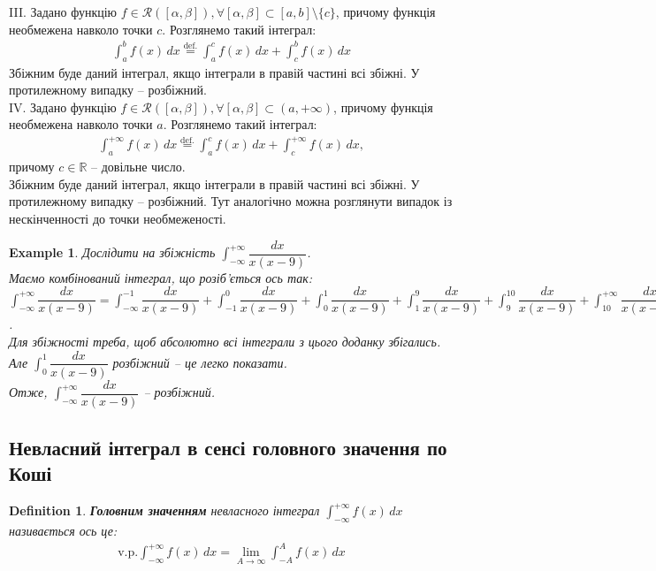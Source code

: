 \documentclass[a4paper, 10pt]{article}
\theoremstyle{theoremdd}
\theoremstyle{theoremdd}
\theoremstyle{theoremdd}
\newtheorem{definition}[theorem]{Definition}
\theoremstyle{theoremdd}
\theoremstyle{theoremdd}
\newtheorem{example}[theorem]{Example}
\theoremstyle{theoremdd}
\theoremstyle{theoremdd}
\theoremstyle{theoremdd}
\theoremstyle{theoremdd}
\begin{document}
III. Задано функцію $f \in \mathcal{R}([\alpha,\beta]), \forall [\alpha,\beta] \subset [a,b] \setminus \{c\}$, причому функція необмежена навколо точки $c$. Розглянемо такий інтеграл:
\begin{align*}
\int_a^b f(x)\,dx \overset{\text{def.}}{=} \int_a^c f(x)\,dx + \int_c^b f(x)\,dx
\end{align*}
Збіжним буде даний інтеграл, якщо інтеграли в правій частині всі збіжні. У протилежному випадку -- розбіжний.
\bigskip \\
IV. Задано функцію $f \in \mathcal{R}([\alpha,\beta]), \forall [\alpha,\beta] \subset (a,+\infty)$, причому функція необмежена навколо точки $a$. Розглянемо такий інтеграл:
\begin{align*}
\int_a^{+\infty} f(x)\,dx \overset{\text{def.}}{=} \int_a^c f(x)\,dx + \int_c^{+\infty} f(x)\,dx,
\end{align*}
причому $c \in \mathbb{R}$ -- довільне число.\\
Збіжним буде даний інтеграл, якщо інтеграли в правій частині всі збіжні. У протилежному випадку -- розбіжний. Тут аналогічно можна розглянути випадок із нескінченності до точки необмеженості.

\begin{example}
Дослідити на збіжність $\displaystyle\int_{-\infty}^{+\infty} \dfrac{dx}{x(x-9)}$.\\
Маємо комбінований інтеграл, що розіб'ється ось так:\\
$\displaystyle\int_{-\infty}^{+\infty} \dfrac{dx}{x(x-9)} = \int_{-\infty}^{-1} \dfrac{dx}{x(x-9)} + \int_{-1}^{0} \dfrac{dx}{x(x-9)} + \int_{0}^{1} \dfrac{dx}{x(x-9)} + \int_{1}^{9} \dfrac{dx}{x(x-9)} + \int_{9}^{10} \dfrac{dx}{x(x-9)} + \int_{10}^{+\infty} \dfrac{dx}{x(x-9)}$.\\
Для збіжності треба, щоб абсолютно всі інтеграли з цього доданку збігались. Але $\displaystyle\int_0^1 \dfrac{dx}{x(x-9)}$ розбіжний -- це легко показати.\\
Отже, $\displaystyle\int_{-\infty}^{+\infty} \dfrac{dx}{x(x-9)}$ -- розбіжний.
\end{example}

\subsection{Невласний інтеграл в сенсі головного значення по Коші}
\begin{definition}
\textbf{Головним значенням} невласного інтеграл $\displaystyle\int_{-\infty}^{+\infty} f(x)\,dx$ називається ось це:
\begin{align*}
\text{v.p.} \int_{-\infty}^{+\infty} f(x)\,dx = \lim_{A \to \infty} \int_{-A}^A f(x)\,dx
\end{align*}
\end{definition}
\end{document}
